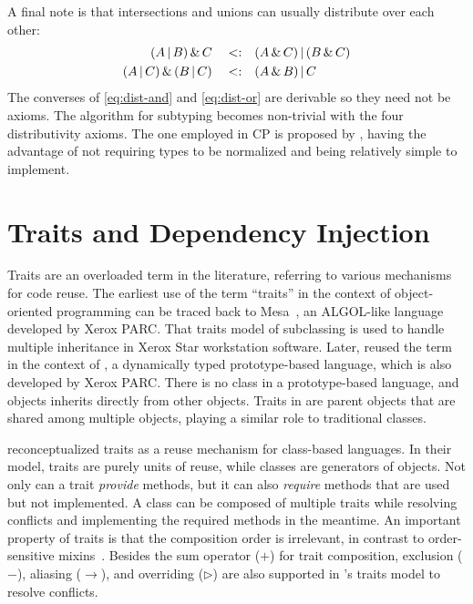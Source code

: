 A final note is that intersections and unions can usually distribute over each other:
\begin{align}
(A \,|\, B) \,\&\, C  \quad          <:& \quad  (A \,\&\, C) \,|\, (B \,\&\, C) \label{eq:dist-and} \\
(A \,|\, C) \,\&\, (B \,|\, C)  \quad <:& \quad  (A \,\&\, B) \,|\, C \label{eq:dist-or}
\end{align}
The converses of \autoref{eq:dist-and} and \autoref{eq:dist-or} are derivable so
they need not be axioms. The algorithm for subtyping becomes non-trivial with
the four distributivity axioms. The one employed in CP is proposed by
\citet{huang2021distributing}, having the advantage of not requiring types to be
normalized and being relatively simple to implement.

\section{Traits and Dependency Injection}

Traits are an overloaded term in the literature, referring to various mechanisms
for code reuse. The earliest use of the term ``traits'' in the context of
object-oriented programming can be traced back to Mesa~\citep{curry1982traits},
an ALGOL-like language developed by Xerox PARC. That traits model of subclassing
is used to handle multiple inheritance in Xerox Star workstation software.
Later, \citet{ungar1991organizing} reused the term in the context of \self, a
dynamically typed prototype-based language, which is also developed by Xerox
PARC. There is no class in a prototype-based language, and objects inherits
directly from other objects. Traits in \self are parent objects that are shared
among multiple objects, playing a similar role to traditional classes.

\citet{ducasse2006traits} reconceptualized traits as a reuse mechanism for
class-based languages. In their model, traits are purely units of reuse, while
classes are generators of objects. Not only can a trait \emph{provide} methods,
but it can also \emph{require} methods that are used but not implemented. A
class can be composed of multiple traits while resolving conflicts and
implementing the required methods in the meantime. An important property of
traits is that the composition order is irrelevant, in contrast to
order-sensitive mixins~\citep{bracha1990mixin}. Besides the sum operator ($+$)
for trait composition, exclusion ($-$), aliasing ($\to$), and overriding
($\rhd$) are also supported in \citeauthor{ducasse2006traits}'s traits model to
resolve conflicts.

